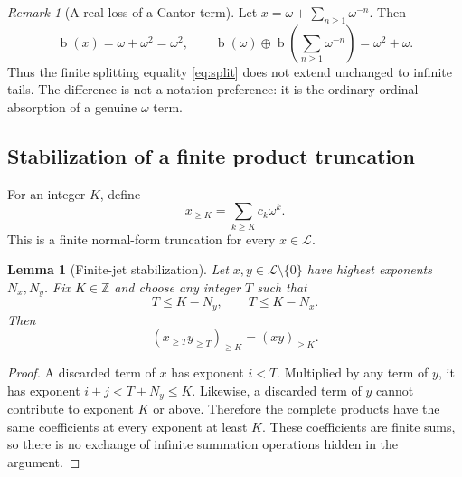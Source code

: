 \documentclass[11pt,letterpaper]{article}
\numberwithin{equation}{section}
\newtheorem{lemma}[theorem]{Lemma}
\theoremstyle{definition}
\theoremstyle{remark}
\newtheorem{remark}[theorem]{Remark}
\newcommand{\Z}{\mathbb{Z}}
\newcommand{\Lau}{\mathcal{L}}
\newcommand{\bd}{\operatorname{b}}
\newcommand{\ns}{\mathbin{\oplus}}
\begin{document}
\begin{remark}[A real loss of a Cantor term]\label{rem:absorption}
Let $x=\omega+\sum_{n\geq1}\omega^{-n}$. Then
\[
 \bd(x)=\omega+\omega^2=\omega^2,
 \qquad
 \bd(\omega)\ns\bd\left(\sum_{n\geq1}\omega^{-n}\right)
 =\omega^2+\omega.
\]
Thus the finite splitting equality \eqref{eq:split} does not extend unchanged
to infinite tails. The difference is not a notation preference: it is the
ordinary-ordinal absorption of a genuine $\omega$ term.
\end{remark}

\subsection{Stabilization of a finite product truncation}
For an integer $K$, define
\[
 x_{\geq K}=\sum_{k\geq K}c_k\omega^k.
\]
This is a finite normal-form truncation for every $x\in\Lau$.

\begin{lemma}[Finite-jet stabilization]\label{lem:jets}
Let $x,y\in\Lau\setminus\{0\}$ have highest exponents $N_x,N_y$.
Fix $K\in\Z$ and choose any integer $T$ such that
\begin{equation}\label{eq:T}
 T\leq K-N_y,\qquad T\leq K-N_x.
\end{equation}
Then
\begin{equation}\label{eq:jet}
 (x_{\geq T}y_{\geq T})_{\geq K}=(xy)_{\geq K}.
\end{equation}
\end{lemma}
\begin{proof}
A discarded term of $x$ has exponent $i<T$. Multiplied by any term of $y$,
it has exponent $i+j<T+N_y\leq K$. Likewise, a discarded term of $y$ cannot
contribute to exponent $K$ or above. Therefore the complete products have the
same coefficients at every exponent at least $K$. These coefficients are
finite sums, so there is no exchange of infinite summation operations hidden
in the argument.
\end{proof}
\end{document}
